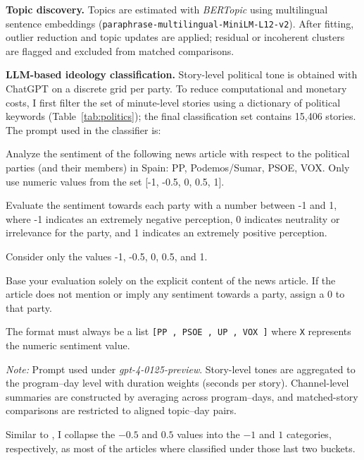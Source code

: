 \documentclass[12pt]{article}
\begin{document}
\textbf{Topic discovery.} Topics are estimated with \emph{BERTopic} using multilingual sentence embeddings (\texttt{paraphrase-multilingual-MiniLM-L12-v2}). After fitting, outlier reduction and topic updates are applied; residual or incoherent clusters are flagged and excluded from matched comparisons.

\textbf{LLM-based ideology classification.} Story-level political tone is obtained with ChatGPT on a discrete grid per party. To reduce computational and monetary costs, I first filter the set of minute-level stories using a dictionary of political keywords (Table~\ref{tab:politics}); the final classification set contains 15{,}406 stories. The prompt used in the classifier is:

\begin{tcolorbox}[colback=blue!5!white, colframe=blue!75!black, title=Prompt]
	Analyze the sentiment of the following news article with respect to the political parties (and their members) in Spain: PP, Podemos/Sumar, PSOE, VOX. Only use numeric values from the set [-1, -0.5, 0, 0.5, 1].
	
	Evaluate the sentiment towards each party with a number between -1 and 1, where -1 indicates an extremely negative perception, 0 indicates neutrality or irrelevance for the party, and 1 indicates an extremely positive perception.
	
	Consider only the values -1, -0.5, 0, 0.5, and 1.
	
	Base your evaluation solely on the explicit content of the news article. If the article does not mention or imply any sentiment towards a party, assign a 0 to that party.
	
	The format must always be a list \texttt{[PP
		, PSOE
		, UP
		, VOX
		]} where \texttt{X} represents the numeric sentiment value.
\end{tcolorbox}

\noindent\textit{Note:} Prompt used under \textit{gpt-4-0125-preview}. Story-level tones are aggregated to the program–day level with duration weights (seconds per story). Channel-level summaries are constructed by averaging across program–days, and matched-story comparisons are restricted to aligned topic–day pairs.


Similar to \cite{BraghieriLLMS}, I collapse the $ -0.5 $ and $ 0.5 $ values into the $ -1 $ and $ 1 $ categories, respectively, as  most of the articles where classified under those last two buckets. 


\newpage
\end{document}
